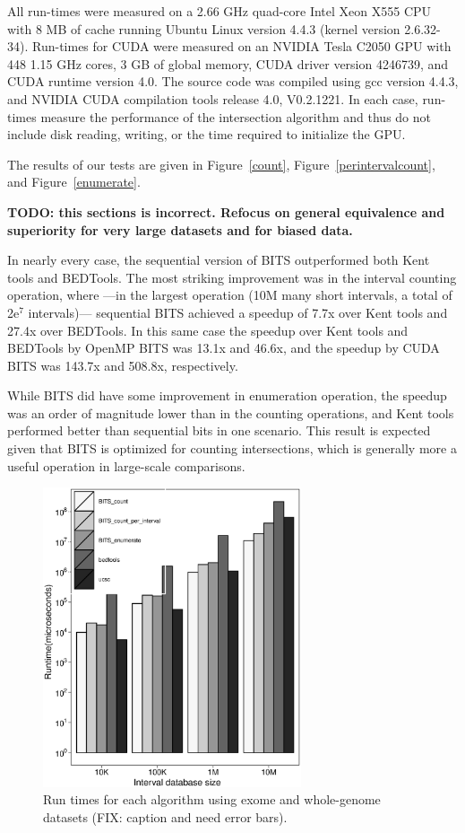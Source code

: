 \documentclass{bioinfo}
\begin{document}
		All run-times were measured on a 2.66 GHz quad-core Intel Xeon X555 CPU with 8
		MB of cache running Ubuntu Linux version 4.4.3 (kernel version 2.6.32-34).
		Run-times for CUDA were measured on an NVIDIA Tesla C2050 GPU with 448 1.15 GHz
		cores, 3 GB of global memory, CUDA driver version 4246739, and CUDA runtime
		version 4.0.  The source code was compiled using gcc version 4.4.3, and NVIDIA
		CUDA compilation tools release 4.0, V0.2.1221.  In each case, run-times measure 
		the performance of the intersection algorithm and thus do not include disk
		reading, writing, or the time required to initialize the GPU.

		The results of our tests are given in Figure~\ref{count},
		Figure~\ref{perintervalcount}, and Figure~\ref{enumerate}.
		
		\textbf{TODO: this sections is incorrect.  Refocus on general equivalence
		and superiority for very large datasets and for biased data.}
		
		In nearly every case, the sequential version of BITS outperformed both Kent
		tools and BEDTools.  The most striking improvement was in the interval counting
		operation, where ---in the largest operation (10M many short intervals, a total
		of 2e$^7$ intervals)--- sequential BITS achieved a speedup of 7.7x over Kent
		tools and 27.4x over BEDTools.  In this same case the speedup over Kent tools
		and BEDTools by OpenMP BITS was 13.1x and 46.6x, and the speedup by CUDA BITS
		was 143.7x and 508.8x, respectively.

		While BITS did have some improvement in enumeration operation, the speedup was
		an order of magnitude lower than in the counting operations, and Kent tools
		performed better than sequential bits in one scenario.  This result is expected
		given that BITS is optimized for counting intersections, which is generally more
		a useful operation in large-scale comparisons.

		\begin{figure}[h]
			\centering
			\includegraphics[width=3in]{figures/genome-v-exome.eps}
			\caption[]{Run times for each algorithm using exome and whole-genome datasets (FIX: caption and need error bars).}
		\end{figure}
		
\end{document}
